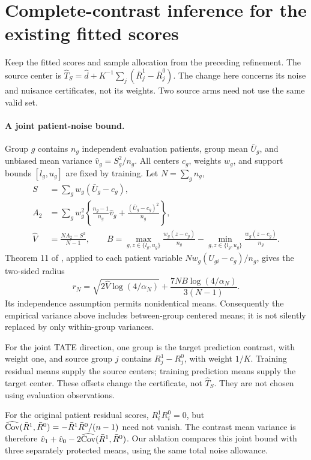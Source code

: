 \section{Complete-contrast inference for the existing fitted scores}
\label{sec:joint-contrast}

Keep the fitted scores and sample allocation from the preceding refinement.
The source center is $\hat T_S=\hat d+K^{-1}\sum_j(\bar R_j^1-\bar R_j^0)$.
The change here concerns its noise and nuisance certificates, not its weights.
Two source arms need not use the same valid set.

\paragraph{A joint patient-noise bound.}
Group $g$ contains $n_g$ independent evaluation patients, group mean $\bar U_g$,
and unbiased mean variance $\hat v_g=S_g^2/n_g$. All centers $c_g$, weights
$w_g$, and support bounds $[l_g,u_g]$ are fixed by training. Let $N=\sum_gn_g$,
\begin{align*}
 S&=\sum_gw_g(\bar U_g-c_g),\\
 A_2&=\sum_gw_g^2\left\{\frac{n_g-1}{n_g}\hat v_g+
                         \frac{(\bar U_g-c_g)^2}{n_g}\right\},\\
 \hat V&=\frac{NA_2-S^2}{N-1},\qquad
 B=\max_{g,z\in\{l_g,u_g\}}\frac{w_g(z-c_g)}{n_g}
   -\min_{g,z\in\{l_g,u_g\}}\frac{w_g(z-c_g)}{n_g}.
\end{align*}
Theorem 11 of \citet{maurer2009}, applied to each patient variable
$Nw_g(U_{gi}-c_g)/n_g$, gives the two-sided radius
\[
 r_N=\sqrt{2\hat V\log(4/\alpha_N)}+
          \frac{7NB\log(4/\alpha_N)}{3(N-1)}.
\]
Its independence assumption permits nonidentical means. Consequently the
empirical variance above includes between-group centered means; it is not
silently replaced by only within-group variances.

For the joint TATE direction, one group is the target prediction contrast,
with weight one, and source group $j$ contains $R_j^1-R_j^0$, with weight
$1/K$. Training residual means supply the source centers; training prediction
means supply the target center. These offsets change the certificate, not
$\hat T_S$. They are not chosen using evaluation observations.

For the original patient residual scores, $R_i^1R_i^0=0$, but
$\widehat{\operatorname{Cov}}(\bar R^1,\bar R^0)=-\bar R^1\bar R^0/(n-1)$ need not vanish.
The contrast mean variance is therefore
$\hat v_1+\hat v_0-2\widehat{\operatorname{Cov}}(\bar R^1,\bar R^0)$.
Our ablation compares this joint bound with three separately protected means,
using the same total noise allowance.


